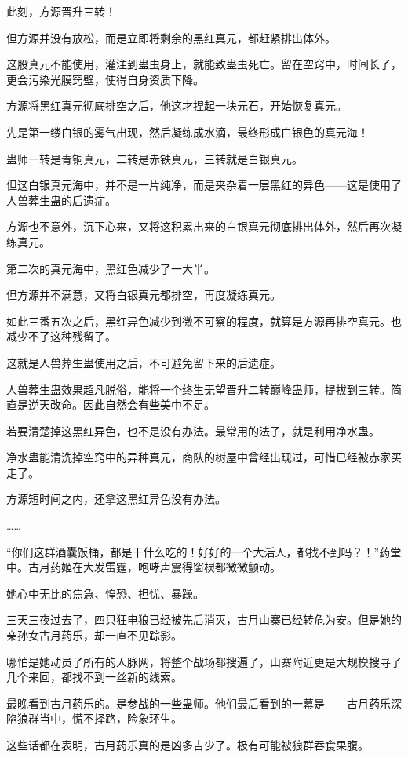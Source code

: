 \begin{this_body}
此刻，方源晋升三转！

但方源并没有放松，而是立即将剩余的黑红真元，都赶紧排出体外。

这股真元不能使用，灌注到蛊虫身上，就能致蛊虫死亡。留在空窍中，时间长了，更会污染光膜窍壁，使得自身资质下降。

方源将黑红真元彻底排空之后，他这才捏起一块元石，开始恢复真元。

先是第一缕白银的雾气出现，然后凝练成水滴，最终形成白银色的真元海！

蛊师一转是青铜真元，二转是赤铁真元，三转就是白银真元。

但这白银真元海中，并不是一片纯净，而是夹杂着一层黑红的异色——这是使用了人兽葬生蛊的后遗症。

方源也不意外，沉下心来，又将这积累出来的白银真元彻底排出体外，然后再次凝练真元。

第二次的真元海中，黑红色减少了一大半。

但方源并不满意，又将白银真元都排空，再度凝练真元。

如此三番五次之后，黑红异色减少到微不可察的程度，就算是方源再排空真元。也减少不了这种残留了。

这就是人兽葬生蛊使用之后，不可避免留下来的后遗症。

人兽葬生蛊效果超凡脱俗，能将一个终生无望晋升二转巅峰蛊师，提拔到三转。简直是逆天改命。因此自然会有些美中不足。

若要清楚掉这黑红异色，也不是没有办法。最常用的法子，就是利用净水蛊。

净水蛊能清洗掉空窍中的异种真元，商队的树屋中曾经出现过，可惜已经被赤家买走了。

方源短时间之内，还拿这黑红异色没有办法。

……

“你们这群酒囊饭桶，都是干什么吃的！好好的一个大活人，都找不到吗？！”药堂中。古月药姬在大发雷霆，咆哮声震得窗棂都微微颤动。

她心中无比的焦急、惶恐、担忧、暴躁。

三天三夜过去了，四只狂电狼已经被先后消灭，古月山寨已经转危为安。但是她的亲孙女古月药乐，却一直不见踪影。

哪怕是她动员了所有的人脉网，将整个战场都搜遍了，山寨附近更是大规模搜寻了几个来回，都找不到一丝新的线索。

最晚看到古月药乐的。是参战的一些蛊师。他们最后看到的一幕是——古月药乐深陷狼群当中，慌不择路，险象环生。

这些话都在表明，古月药乐真的是凶多吉少了。极有可能被狼群吞食果腹。


\end{this_body}
